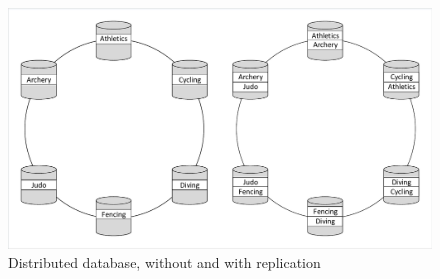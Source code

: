 \begin{figure}
\caption{Distributed database, without and with replication}
\centering
\includegraphics[trim = 5 5 5 5, clip, width=\textwidth]{img/dbdist}
\end{figure}
